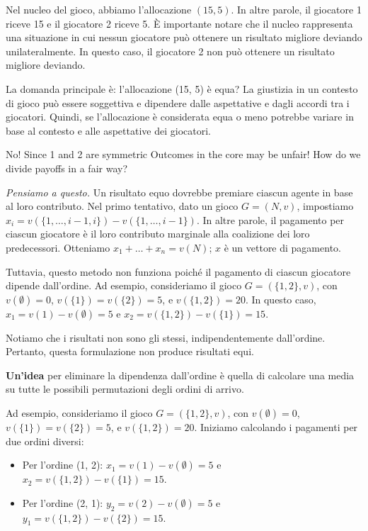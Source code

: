 Nel nucleo del gioco, abbiamo l'allocazione $(15, 5)$. In altre parole, il
giocatore 1 riceve 15 e il giocatore 2 riceve 5. È importante notare che il
nucleo rappresenta una situazione in cui nessun giocatore può ottenere un
risultato migliore deviando unilateralmente. In questo caso, il giocatore 2 non
può ottenere un risultato migliore deviando.

La domanda principale è: l'allocazione (15, 5) è equa? La giustizia in un
contesto di gioco può essere soggettiva e dipendere dalle aspettative e dagli
accordi tra i giocatori. Quindi, se l'allocazione è considerata equa o meno
potrebbe variare in base al contesto e alle aspettative dei giocatori.

No! Since 1 and 2 are symmetric Outcomes in the core may be unfair! How do we
divide payoffs in a fair way?

\textit{Pensiamo a questo.} Un risultato equo dovrebbe premiare ciascun agente in base al loro contributo.
Nel primo tentativo, dato un gioco $G = (N, v)$, impostiamo $x_i = v(\{1,
    \ldots, i-1, i\}) - v(\{1, \ldots, i-1\})$. In altre parole, il pagamento per
ciascun giocatore è il loro contributo marginale alla coalizione dei loro
predecessori. Otteniamo $x_1 + \ldots + x_n = v(N)$; $x$ è un vettore di
pagamento.

Tuttavia, questo metodo non funziona poiché il pagamento di ciascun giocatore
dipende dall'ordine. Ad esempio, consideriamo il gioco $G = (\{1, 2\}, v)$, con
$v(\emptyset) = 0$, $v(\{1\}) = v(\{2\}) = 5$, e $v(\{1, 2\}) = 20$. In questo
caso, $x_1 = v(1) - v(\emptyset) = 5$ e $x_2 = v(\{1, 2\}) - v(\{1\}) = 15$.

Notiamo che i risultati non sono gli stessi, indipendentemente dall'ordine.
Pertanto, questa formulazione non produce risultati equi.

\textbf{Un'idea} per eliminare la dipendenza dall'ordine è quella di calcolare una media su tutte le possibili permutazioni degli ordini di arrivo.

Ad esempio, consideriamo il gioco $G = (\{1, 2\}, v)$, con $v(\emptyset) = 0$,
$v(\{1\}) = v(\{2\}) = 5$, e $v(\{1, 2\}) = 20$. Iniziamo calcolando i
pagamenti per due ordini diversi:
\begin{itemize}
    \item Per l'ordine (1, 2): $x_1 = v(1) - v(\emptyset) = 5$ e $x_2 = v(\{1, 2\}) -
              v(\{1\}) = 15$.
    \item Per l'ordine (2, 1): $y_2 = v(2) - v(\emptyset) = 5$ e $y_1 = v(\{1, 2\}) -
              v(\{2\}) = 15$.
\end{itemize}


